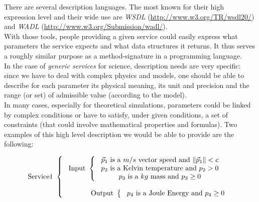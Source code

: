 \documentclass[a4paper,11pt] {article}
\begin{document}
There are several description languages. The most known for their high expression level and their
wide use are \emph{WSDL} (\href{http://www.w3.org/TR/wsdl20/}{http://www.w3.org/TR/wsdl20/}) and
\textit{WADL} (\href{http://www.w3.org/Submission/wadl/}{http://www.w3.org/Submission/wadl/}).\\
With those tools, people providing a given service could easily express what parameters the service
expects and what data structures it returns. It thus serves a roughly similar purpose as a
method-signature in a programming language.\\

In the case of {\it generic services} for science, description needs are very specific: since we
have to deal with complex physics and models, one should be able to describe for each parameter its
physical meaning, its unit and precision and the range (or set) of admissible value (according to
the model).\\ 

In many cases, especially for theoretical simulations, parameters could be linked by
complex conditions or have to satisfy, under given conditions, a set of constraints (that could
involve mathematical properties and formulas).
Two examples of this high level description we would be able to provide are the following:

\begin{equation}
\mbox{Service1 }\left\{
\begin{array}{l}
\ \mbox{Input } \left\{
\begin{array}{c}
 \mbox{$\vec p_1$ is a $m/s$ vector speed and $\| \vec p_1\|<c$} \\
 \mbox{ $p_2$ is a Kelvin temperature and $p_2>0$ }\\
 \mbox{$p_3$ is a $kg$ mass and $p_3\geq 0$}\\
\end{array}
\right. \\
\\
\ \mbox{\hspace{1cm} Output } \left\{
\begin{array}{l}
 \mbox{ $p_4$ is a Joule Energy and $p_4 \geq 0$} \\
 \end{array}
\right.\\
\end{array}
\right.
\end{equation}
\end{document}
